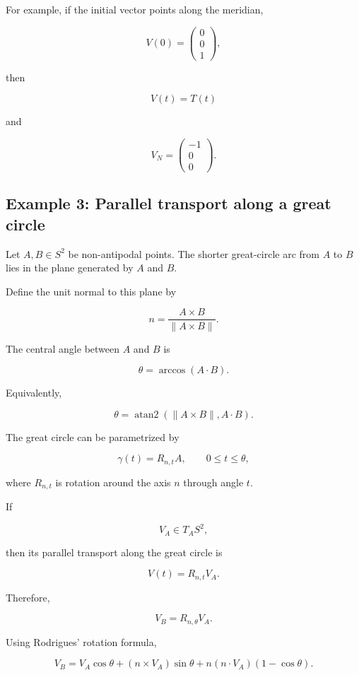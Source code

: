 \documentclass[12pt,a4paper]{article}
\theoremstyle{notespace}
\begin{document}
For example, if the initial vector points along the meridian,

\[
V(0)
=
\begin{pmatrix}
	0\\
	0\\
	1
\end{pmatrix},
\]

then

\[
V(t)=T(t)
\]

and

\[
\boxed{
	V_N
	=
	\begin{pmatrix}
		-1\\
		0\\
		0
	\end{pmatrix}.
}
\]

\subsection{Example 3: Parallel transport along a great circle}

Let \(A,B\in S^2\) be non-antipodal points. The shorter great-circle arc
from \(A\) to \(B\) lies in the plane generated by \(A\) and \(B\).

Define the unit normal to this plane by

\[
n
=
\frac{A\times B}{\|A\times B\|}.
\]

The central angle between \(A\) and \(B\) is

\[
\theta
=
\arccos(A\cdot B).
\]

Equivalently,

\[
\theta
=
\operatorname{atan2}
\left(
\|A\times B\|,
A\cdot B
\right).
\]

The great circle can be parametrized by

\[
\gamma(t)
=
R_{n,t}A,
\qquad
0\leq t\leq\theta,
\]

where \(R_{n,t}\) is rotation around the axis \(n\) through angle \(t\).

If

\[
V_A\in T_AS^2,
\]

then its parallel transport along the great circle is

\[
\boxed{
	V(t)=R_{n,t}V_A.
}
\]

Therefore,

\[
\boxed{
	V_B=R_{n,\theta}V_A.
}
\]

Using Rodrigues' rotation formula,

\[
\boxed{
	V_B
	=
	V_A\cos\theta
	+
	(n\times V_A)\sin\theta
	+
	n(n\cdot V_A)(1-\cos\theta).
}
\]
\end{document}
